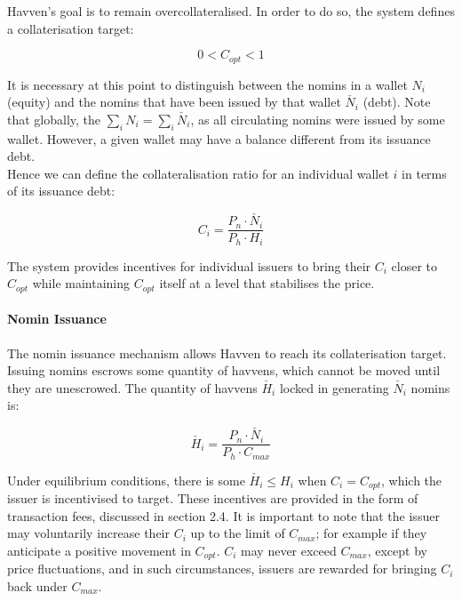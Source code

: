 
\noindent Havven's goal is to remain overcollateralised. In order to do so, the system defines a collaterisation target:

\begin{equation}
0 < C_{opt} < 1  \label{eq:target}
\end{equation}

\noindent It is necessary at this point to distinguish between the nomins in a wallet $N_i$ (equity) and the nomins that have been issued by that wallet $\check{N_i}$ (debt). Note that globally, the $\sum_{i}N_i = \sum_{i}\check{N_i}$, as all circulating nomins were issued by some wallet. However, a given wallet may have a balance different from its issuance debt.\\

\noindent Hence we can define the collateralisation ratio for an individual wallet $i$ in terms of its issuance debt:

\begin{equation}
C_i = \frac{P_n \cdot \check{N_i}}{P_h \cdot H_i}  \label{eq:individualcollat}
\end{equation}

\noindent The system provides incentives for individual issuers to bring their $C_i$ closer to $C_{opt}$ while maintaining $C_{opt}$ itself at a level that stabilises the price.

\paragraph{Nomin Issuance}

\noindent The nomin issuance mechanism allows Havven to reach its collaterisation target. Issuing nomins escrows some quantity of havvens, which cannot be moved until they are unescrowed. The quantity of havvens $\check{H_i}$ locked in generating $\check{N_i}$ nomins is:

\begin{equation}
\check{H_i} = \frac{P_n \cdot \check{N_i}}{P_h \cdot C_{max}}  \label{eq:escrowed}
\end{equation}

\noindent Under equilibrium conditions, there is some $\check{H_i} \leq H_i$ when $C_i = C_{opt}$, which the issuer is incentivised to target. These incentives are provided in the form of transaction fees, discussed in section 2.4. It is important to note that the issuer may voluntarily increase their $C_i$ up to the limit of $C_{max}$; for example if they anticipate a positive movement in $C_{opt}$. $C_i$ may never exceed $C_{max}$, except by price fluctuations, and in such circumstances, issuers are rewarded for bringing $C_i$ back under $C_{max}$. \\

